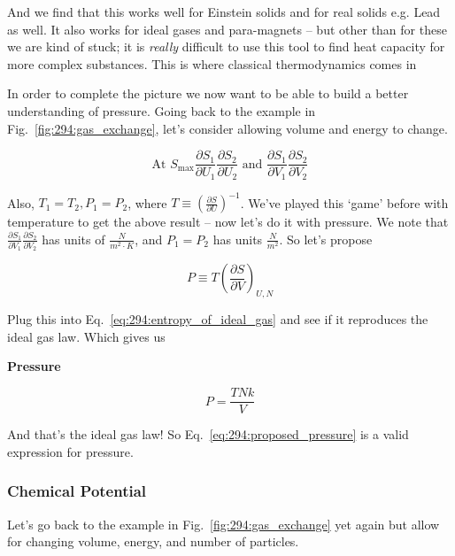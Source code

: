 \documentclass[10pt]{article}
\begin{document}
And we find that this works well for Einstein solids and for real solids e.g. Lead as well.
It also works for ideal gases and para-magnets -- but other than for these we are kind of stuck; it is \textit{really} difficult to use this tool to find heat capacity for more complex substances. This is where classical thermodynamics comes in


In order to complete the picture we now want to be able to build a better understanding of pressure.
Going back to the example in Fig.~\ref{fig:294:gas_exchange}, let's consider allowing volume and energy to change.

\begin{equation}
	\text{At } S_{\text{max}} 
	\frac{\partial S_1}{\partial U_1} \frac{\partial S_2}{\partial U_2} 
	\text{   and  }
	\frac{\partial S_1}{\partial V_1} \frac{\partial S_2}{\partial V_2} 
\end{equation}

Also, $ T_1 = T_2, P_1 = P_2 $, where $ T \equiv (\frac{\partial S}{\partial U} )^{-1} $.
We've played this `game' before with temperature to get the above result -- now let's do it with pressure. 
We note that  $ \frac{\partial S_1}{\partial V_1} \frac{\partial S_2}{\partial V_2} $ has units of $  \frac{N}{m^2 \cdot K }$, and $ P_1 = P_2 $  has units $ \frac{N}{m^2} $. So let's propose

\begin{equation}
	P \equiv T(\frac{\partial S}{\partial V} ) _{U, N}
	\label{eq:294:proposed_pressure}
\end{equation}

Plug this into Eq.~\ref{eq:294:entropy_of_ideal_gas} and see if it reproduces the ideal gas law. 
Which gives us

\begin{definition}
	\textbf{Pressure} 

	\begin{equation}
		P = \frac{TNk}{V}
	\end{equation}
\end{definition}


And that's the ideal gas law! 
So Eq.~\ref{eq:294:proposed_pressure} is a valid expression for pressure.



\subsubsection{Chemical Potential}

Let's go back to the example in Fig.~\ref{fig:294:gas_exchange} yet again but allow for changing volume, energy, and number of particles.
\end{document}
